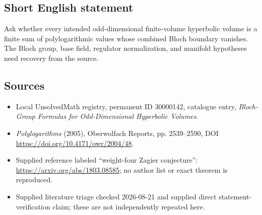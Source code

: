 \documentclass[11pt]{article}
\begin{document}
\subsection{Short English statement}
Ask whether every intended odd-dimensional finite-volume hyperbolic volume is a finite sum of polylogarithmic values whose combined Bloch boundary vanishes. The Bloch group, base field, regulator normalization, and manifold hypotheses need recovery from the source.
\subsection{Sources}
\begin{itemize}
\item Local UnsolvedMath registry, permanent ID 30000142, catalogue entry, \emph{Bloch-Group Formulas for Odd-Dimensional Hyperbolic Volumes}.
\item \emph{Polylogarithms} (2005), Oberwolfach Reports, pp. 2539--2590, DOI \url{https://doi.org/10.4171/owr/2004/48}.
\item Supplied reference labeled ``weight-four Zagier conjecture'': \url{https://arxiv.org/abs/1803.08585}; no author list or exact theorem is reproduced.
\item Supplied literature triage checked 2026-08-21 and supplied direct statement-verification claim; these are not independently repeated here.
\end{itemize}
\end{document}
